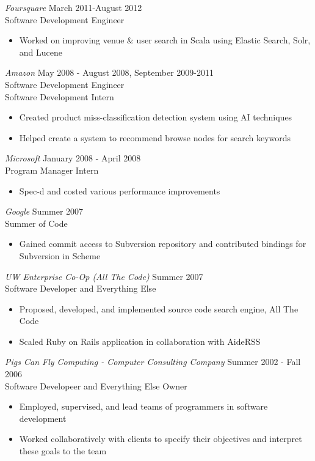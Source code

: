 \documentclass[10pt,line,margin=0.1]{newsres}
\begin{document}
\begin{resume}
\begin{itemize}
        \end{itemize}
        {\sl Foursquare} \hfill March 2011-August 2012\\
        Software Development Engineer
        \begin{itemize}  \itemsep -2pt %
        \item Worked on improving venue \& user search in Scala using Elastic Search, Solr, and Lucene
        \end{itemize}
        {\sl Amazon} \hfill            May 2008 - August 2008, September 2009-2011 \\
        Software Development Engineer \\
        Software Development Intern
        \begin{itemize}  \itemsep -2pt %
        \item Created product miss-classification detection system using AI techniques
        \item Helped create a system to recommend browse nodes for search keywords
        \end{itemize} 
        {\sl Microsoft} \hfill        January 2008 - April 2008 \\
        Program Manager Intern
        \begin{itemize}
        \item Spec-d and costed various performance improvements
        \end{itemize} 
        {\sl Google} \hfill        Summer 2007 \\
        Summer of Code
        \begin{itemize}
        \item Gained commit access to Subversion repository and contributed bindings for Subversion in Scheme
        \end{itemize} 
        {\sl UW Enterprise Co-Op (All The Code)} \hfill Summer 2007 \\
        Software Developer and Everything Else
        \begin{itemize}  \itemsep -2pt %
        \item{Proposed, developed, and implemented source code search engine, All The Code}
        \item{Scaled Ruby on Rails application in collaboration with AideRSS}
        \end{itemize}
        {\sl Pigs Can Fly Computing - Computer Consulting Company} \hfill Summer 2002 - Fall 2006 \\
        Software Developeer and Everything Else Owner
        \begin{itemize}  \itemsep -2pt %
        \item{Employed, supervised, and lead teams of programmers in software development}
        \item{Worked collaboratively with clients to specify their objectives and interpret these goals to the team}
        \end{itemize}


\end{resume}
\end{document}
